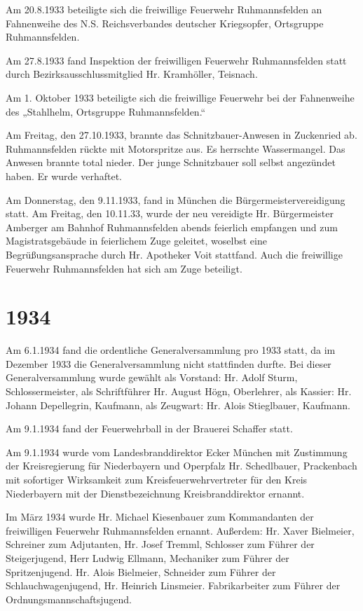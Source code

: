 \documentclass[12pt,a4paper]{book}
\begin{document}
Am 20.8.1933 beteiligte sich die freiwillige Feuerwehr Ruhmannsfelden an
Fahnenweihe des N.S. Reichsverbandes deutscher Kriegsopfer, Ortsgruppe
Ruhmannsfelden.

Am 27.8.1933 fand Inspektion der freiwilligen Feuerwehr Ruhmannsfelden statt
durch Bezirksausschlussmitglied Hr. Kramhöller, Teisnach.

Am 1. Oktober 1933 beteiligte sich die freiwillige Feuerwehr bei der Fahnenweihe
des „Stahlhelm, Ortsgruppe Ruhmannsfelden.“

Am Freitag, den 27.10.1933, brannte das Schnitzbauer-Anwesen in Zuckenried ab.
Ruhmannsfelden rückte mit Motorspritze aus. Es herrschte Wassermangel. Das
Anwesen brannte total nieder. Der junge Schnitzbauer soll selbst angezündet
haben. Er wurde verhaftet.

Am Donnerstag, den 9.11.1933, fand in München die Bürgermeistervereidigung
statt. Am Freitag, den 10.11.33, wurde der neu vereidigte Hr. Bürgermeister
Amberger am Bahnhof Ruhmannsfelden abends feierlich empfangen und zum
Magistratsgebäude in feierlichem Zuge geleitet, woselbst eine
Begrüßungsansprache durch Hr. Apotheker Voit stattfand. Auch die freiwillige
Feuerwehr Ruhmannsfelden hat sich am Zuge beteiligt.

\section*{1934}

Am 6.1.1934 fand die ordentliche Generalversammlung pro 1933 statt, da im
Dezember 1933 die Generalversammlung nicht stattfinden durfte. Bei dieser
Generalversammlung wurde gewählt als Vorstand: Hr. Adolf Sturm,
Schlossermeister, als Schriftführer Hr. August Högn, Oberlehrer, als Kassier:
Hr. Johann Depellegrin, Kaufmann, als Zeugwart: Hr. Alois Stieglbauer, Kaufmann.

Am 9.1.1934 fand der Feuerwehrball in der Brauerei Schaffer statt.

Am 9.1.1934 wurde vom Landesbranddirektor Ecker München mit Zustimmung der
Kreisregierung für Niederbayern und Operpfalz Hr. Schedlbauer, Prackenbach mit
sofortiger Wirksamkeit zum Kreisfeuerwehrvertreter für den Kreis Niederbayern
mit der Dienstbezeichnung Kreisbranddirektor ernannt.

Im März 1934 wurde Hr. Michael Kiesenbauer zum Kommandanten der freiwilligen
Feuerwehr Ruhmannsfelden ernannt. Außerdem: Hr. Xaver Bielmeier, Schreiner zum
Adjutanten, Hr. Josef Tremml, Schlosser zum Führer der Steigerjugend, Herr
Ludwig Ellmann, Mechaniker zum Führer der Spritzenjugend. Hr. Alois Bielmeier,
Schneider zum Führer der Schlauchwagenjugend, Hr. Heinrich Linsmeier.
Fabrikarbeiter zum Führer der Ordnungsmannschaftsjugend.
\end{document}
